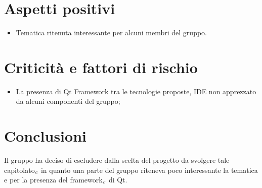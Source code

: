 \section{Aspetti positivi} \label{C7AspettiPositivi}
\begin{itemize}
	\item Tematica ritenuta interessante per alcuni membri del gruppo.
\end{itemize}
\section{Criticità e fattori di rischio} \label{C7CriticitàEFattoriDiRischio}
\begin{itemize}
	\item La presenza di Qt Framework tra le tecnologie proposte, IDE non apprezzato da alcuni componenti del gruppo;
\end{itemize}
\section{Conclusioni} \label{C7Conclusioni}
Il gruppo ha deciso di escludere dalla scelta del progetto da svolgere tale capitolato$_{\scaleto{G}{3pt}}$ in quanto una parte del gruppo riteneva poco interessante la tematica e per la presenza  del framework$_{\scaleto{G}{3pt}}$ di Qt.